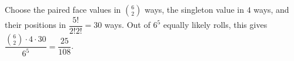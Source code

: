 Choose the paired face values in $\binom62$ ways, the singleton value in $4$ ways, and their positions in $\dfrac{5!}{2!2!}=30$ ways. Out of $6^5$ equally likely rolls, this gives $\boxed{\dfrac{\binom62\cdot4\cdot30}{6^5}=\dfrac{25}{108}}$.
